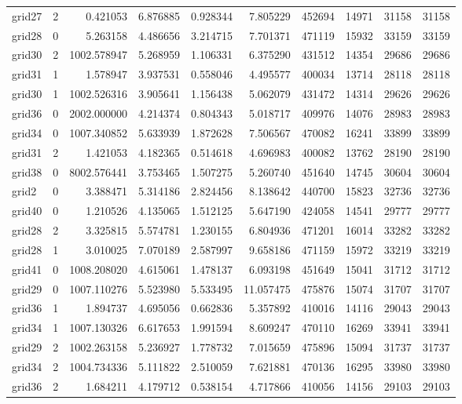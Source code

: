 \begin{longtable}{|l|r|r|r|r|r|r|r|r|r|}
grid27 & 2 & 0.421053 & 6.876885 & 0.928344 & 7.805229 & 452694 & 14971 & 31158 & 31158 \\
grid28 & 0 & 5.263158 & 4.486656 & 3.214715 & 7.701371 & 471119 & 15932 & 33159 & 33159 \\
grid30 & 2 & 1002.578947 & 5.268959 & 1.106331 & 6.375290 & 431512 & 14354 & 29686 & 29686 \\
grid31 & 1 & 1.578947 & 3.937531 & 0.558046 & 4.495577 & 400034 & 13714 & 28118 & 28118 \\
grid30 & 1 & 1002.526316 & 3.905641 & 1.156438 & 5.062079 & 431472 & 14314 & 29626 & 29626 \\
grid36 & 0 & 2002.000000 & 4.214374 & 0.804343 & 5.018717 & 409976 & 14076 & 28983 & 28983 \\
grid34 & 0 & 1007.340852 & 5.633939 & 1.872628 & 7.506567 & 470082 & 16241 & 33899 & 33899 \\
grid31 & 2 & 1.421053 & 4.182365 & 0.514618 & 4.696983 & 400082 & 13762 & 28190 & 28190 \\
grid38 & 0 & 8002.576441 & 3.753465 & 1.507275 & 5.260740 & 451640 & 14745 & 30604 & 30604 \\
grid2 & 0 & 3.388471 & 5.314186 & 2.824456 & 8.138642 & 440700 & 15823 & 32736 & 32736 \\
grid40 & 0 & 1.210526 & 4.135065 & 1.512125 & 5.647190 & 424058 & 14541 & 29777 & 29777 \\
grid28 & 2 & 3.325815 & 5.574781 & 1.230155 & 6.804936 & 471201 & 16014 & 33282 & 33282 \\
grid28 & 1 & 3.010025 & 7.070189 & 2.587997 & 9.658186 & 471159 & 15972 & 33219 & 33219 \\
grid41 & 0 & 1008.208020 & 4.615061 & 1.478137 & 6.093198 & 451649 & 15041 & 31712 & 31712 \\
grid29 & 0 & 1007.110276 & 5.523980 & 5.533495 & 11.057475 & 475876 & 15074 & 31707 & 31707 \\
grid36 & 1 & 1.894737 & 4.695056 & 0.662836 & 5.357892 & 410016 & 14116 & 29043 & 29043 \\
grid34 & 1 & 1007.130326 & 6.617653 & 1.991594 & 8.609247 & 470110 & 16269 & 33941 & 33941 \\
grid29 & 2 & 1002.263158 & 5.236927 & 1.778732 & 7.015659 & 475896 & 15094 & 31737 & 31737 \\
grid34 & 2 & 1004.734336 & 5.111822 & 2.510059 & 7.621881 & 470136 & 16295 & 33980 & 33980 \\
grid36 & 2 & 1.684211 & 4.179712 & 0.538154 & 4.717866 & 410056 & 14156 & 29103 & 29103 \\

\end{longtable}
